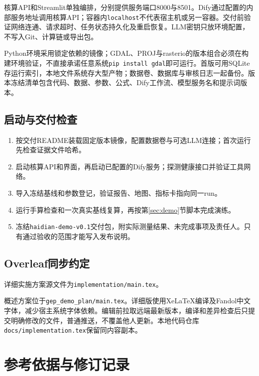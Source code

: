 \documentclass[12pt,a4paper,fontset=fandol]{ctexart}
\newcommand{\file}[1]{\nolinkurl{#1}}
\begin{document}
核算API和Streamlit单独编排，分别提供服务端口8000与8501。Dify通过配置的内部服务地址调用核算API；容器内\file{localhost}不代表宿主机或另一容器。交付前验证网络连通、请求超时、任务状态持久化及重启恢复。LLM密钥只放环境配置，不写入Git、计算链或导出包。

Python环境采用锁定依赖的镜像；GDAL、PROJ与rasterio的版本组合必须在构建环境验证，不直接承诺任意系统\file{pip install gdal}即可运行。首版可用SQLite存运行索引，本地文件系统存大型产物；数据卷、数据库与审核日志一起备份。版本冻结清单包含代码、数据、参数、公式、Dify工作流、模型服务名和提示词版本。

\subsection{启动与交付检查}
\begin{enumerate}
\item 按交付README装载固定版本镜像，配置数据卷与可选LLM连接；首次运行先检查证据文件哈希。
\item 启动核算API和界面，再启动已配置的Dify服务；探测健康接口并验证工具网络。
\item 导入冻结基线和参数登记，验证报告、地图、指标卡指向同一run。
\item 运行手算检查和一次真实基线复算，再按第\ref{sec:demo}节脚本完成演练。
\item 冻结\file{haidian-demo-v0.1}交付包，附实际测量结果、未完成事项及责任人。只有通过验收的范围才能写入发布说明。
\end{enumerate}

\subsection{Overleaf同步约定}
详细实施方案源文件为\file{implementation/main.tex}。

概述方案位于\file{gep_demo_plan/main.tex}。详细版使用XeLaTeX编译及Fandol中文字体，减少宿主系统字体依赖。编辑前拉取远端最新版本，编译和差异检查后只提交明确修改的文件，普通推送，不覆盖他人更新。本地代码仓库\file{docs/implementation.tex}保留同内容副本。

\section{参考依据与修订记录}
\end{document}
